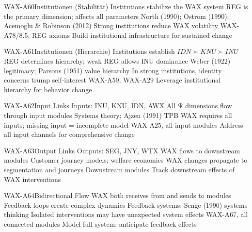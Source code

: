 \begin{axiomspec}{WAX-A60}{Institutionen (Stabilität)}
 Institutions stabilize the WAX system
 REG is the primary dimension; affects all parameters
 North (1990); Ostrom (1990); Acemoglu \& Robinson (2012)
 Strong institutions reduce WAX volatility
 WAX-A78/8.5, REG axioms
 Build institutional infrastructure for sustained change
\end{axiomspec}

\begin{axiomspec}{WAX-A61}{Institutionen (Hierarchie)}
 Institutions establish $IDN \succ KNU \succ INU$
 REG determines hierarchy; weak REG allows INU dominance
 Weber (1922) legitimacy; Parsons (1951) value hierarchy
 In strong institutions, identity concerns trump self-interest
 WAX-A59, WAX-A29
 Leverage institutional hierarchy for behavior change
\end{axiomspec}


\begin{axiomspec}{WAX-A62}{Input Links}
 Inputs: INU, KNU, IDN, AWX
 All Ψ dimensions flow through input modules
 Systems theory; Ajzen (1991) TPB
 WAX requires all inputs; missing input = incomplete model
 WAX-A25, all input modules
 Address all input channels for comprehensive change
\end{axiomspec}

\begin{axiomspec}{WAX-A63}{Output Links}
 Outputs: SEG, JNY, WTX
 WAX flows to downstream modules
 Customer journey models; welfare economics
 WAX changes propagate to segmentation and journeys
 Downstream modules
 Track downstream effects of WAX interventions
\end{axiomspec}

\begin{axiomspec}{WAX-A64}{Bidirectional Flow}
 WAX both receives from and sends to modules
 Feedback loops create complex dynamics
 Feedback systems; Senge (1990) systems thinking
 Isolated interventions may have unexpected system effects
 WAX-A67, all connected modules
 Model full system; anticipate feedback effects
\end{axiomspec}

